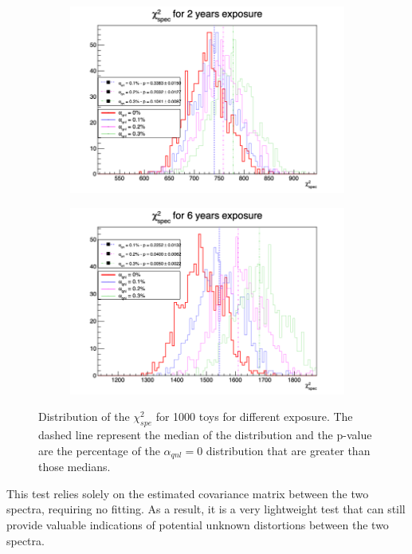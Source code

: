 \documentclass[../main.tex]{subfiles}
\begin{document}
\begin{figure}[th]
  \begin{subfigure}[t]{0.48\linewidth}
    \includegraphics[width=\linewidth]{images/joint_fit/stat_tests/chi2_spec_2y.png}
  \end{subfigure}
  \begin{subfigure}[t]{0.48\linewidth}
    \includegraphics[width=\linewidth]{images/joint_fit/stat_tests/chi2_spec_6y.png}
  \end{subfigure}
  \caption{Distribution of the $\chi^2_{spe}$ for 1000 toys for different exposure. The dashed line represent the median of the distribution and the p-value are the percentage of the $\alpha_{qnl} = 0$ distribution that are greater than those medians.}
  \label{fig:joint_fit:chi2_spec}
\end{figure}

This test relies solely on the estimated covariance matrix between the two spectra, requiring no fitting. As a result, it is a very lightweight test that can still provide valuable indications of potential unknown distortions between the two spectra.
\end{document}
